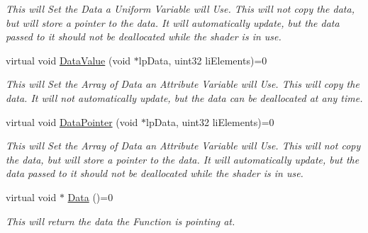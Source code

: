 \begin{DoxyCompactItemize}
\begin{DoxyCompactList}\small\item\em This will Set the Data a Uniform Variable will Use. This will not copy the data, but will store a pointer to the data. It will automatically update, but the data passed to it should not be deallocated while the shader is in use. \end{DoxyCompactList}\item 
\hypertarget{classc_user_variable_a16850159182c5c65848a733d3ac99dcd}{
virtual void \hyperlink{classc_user_variable_a16850159182c5c65848a733d3ac99dcd}{DataValue} (void $\ast$lpData, uint32 liElements)=0}
\label{classc_user_variable_a16850159182c5c65848a733d3ac99dcd}

\begin{DoxyCompactList}\small\item\em This will Set the Array of Data an Attribute Variable will Use. This will copy the data. It will not automatically update, but the data can be deallocated at any time. \end{DoxyCompactList}\item 
\hypertarget{classc_user_variable_a3056065bfb947fab5d28066f049fd49d}{
virtual void \hyperlink{classc_user_variable_a3056065bfb947fab5d28066f049fd49d}{DataPointer} (void $\ast$lpData, uint32 liElements)=0}
\label{classc_user_variable_a3056065bfb947fab5d28066f049fd49d}

\begin{DoxyCompactList}\small\item\em This will Set the Array of Data an Attribute Variable will Use. This will not copy the data, but will store a pointer to the data. It will automatically update, but the data passed to it should not be deallocated while the shader is in use. \end{DoxyCompactList}\item 
\hypertarget{classc_user_variable_abeed824e982c259715e8ddedc3aa5665}{
virtual void $\ast$ \hyperlink{classc_user_variable_abeed824e982c259715e8ddedc3aa5665}{Data} ()=0}
\label{classc_user_variable_abeed824e982c259715e8ddedc3aa5665}

\begin{DoxyCompactList}\small\item\em This will return the data the Function is pointing at. \end{DoxyCompactList}\end{DoxyCompactItemize}


